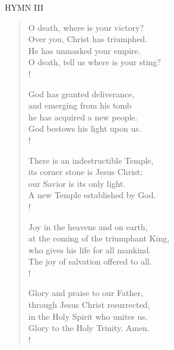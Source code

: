 \noindent\small{\uppercase{Hymn III}}\normalsize\label{easter:lastHymn}
\begin{verse}
O death, where is your victory?\\
Over you, Christ has triumphed.\\
He has unmasked your empire.\\
O death, tell us where is your sting?\\!

God has granted deliverance, \\
and emerging from his tomb\\
he has acquired a new people.\\
God bestows his light upon us.\\!

There is an indestructible Temple,\\
its corner stone is Jesus Christ;\\
our Savior is its only light.\\
A new Temple established by God.\\!

Joy in the heavens and on earth,\\
at the coming of the triumphant King,\\
who gives his life for all mankind.\\
The joy of salvation offered to all.\\!

Glory and praise to our Father,\\
through Jesus Christ resurrected,\\
in the Holy Spirit who unites us.\\
Glory to the Holy Trinity. Amen.\\!
\end{verse}
